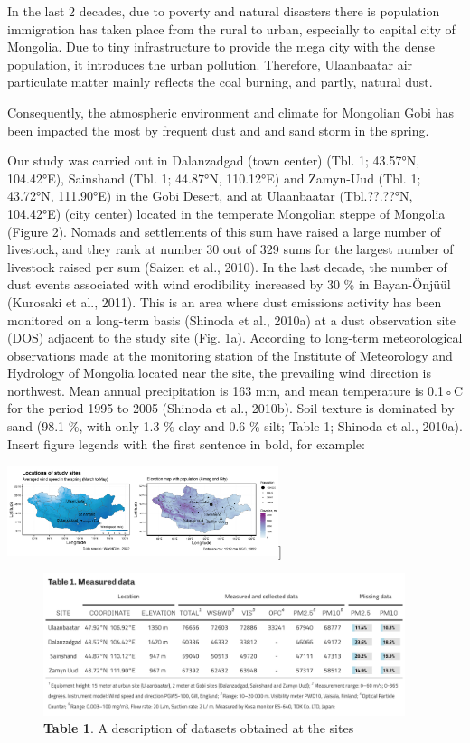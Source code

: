 \documentclass[
  11pt,
]{article}
\begin{document}
In the last 2 decades, due to poverty and natural disasters there is
population immigration has taken place from the rural to urban,
especially to capital city of Mongolia. Due to tiny infrastructure to
provide the mega city with the dense population, it introduces the urban
pollution. Therefore, Ulaanbaatar air particulate matter mainly reflects
the coal burning, and partly, natural dust.

Consequently, the atmospheric environment and climate for Mongolian Gobi
has been impacted the most by frequent dust and and sand storm in the
spring.

Our study was carried out in Dalanzadgad (town center) (Tbl. 1; 43.57°N,
104.42°E), Sainshand (Tbl. 1; 44.87°N, 110.12°E) and Zamyn-Uud (Tbl. 1;
43.72°N, 111.90°E) in the Gobi Desert, and at Ulaanbaatar (Tbl.??.??°N,
104.42°E) (city center) located in the temperate Mongolian steppe of
Mongolia (Figure 2). Nomads and settlements of this sum have raised a
large number of livestock, and they rank at number 30 out of 329 sums
for the largest number of livestock raised per sum (Saizen et al.,
2010). In the last decade, the number of dust events associated with
wind erodibility increased by 30 \% in Bayan-Önjüül (Kurosaki et al.,
2011). This is an area where dust emissions activity has been monitored
on a long-term basis (Shinoda et al., 2010a) at a dust observation site
(DOS) adjacent to the study site (Fig. 1a). According to long-term
meteorological observations made at the monitoring station of the
Institute of Meteorology and Hydrology of Mongolia located near the
site, the prevailing wind direction is northwest. Mean annual
precipitation is 163 mm, and mean temperature is 0.1◦C for the period
1995 to 2005 (Shinoda et al., 2010b). Soil texture is dominated by sand
(98.1 \%, with only 1.3 \% clay and 0.6 \% silt; Table 1; Shinoda et
al., 2010a). Insert figure legends with the first sentence in bold, for
example:

\newpage

\includegraphics[width=3.125in,height=\textheight,keepaspectratio]{images/figure_1.png}{]}

\begin{figure}
\centering
\includegraphics[width=4.16667in,height=\textheight,keepaspectratio]{images/table_1.png}
\caption{\textbf{Table 1}. A description of datasets obtained at the
sites}
\end{figure}
\end{document}
